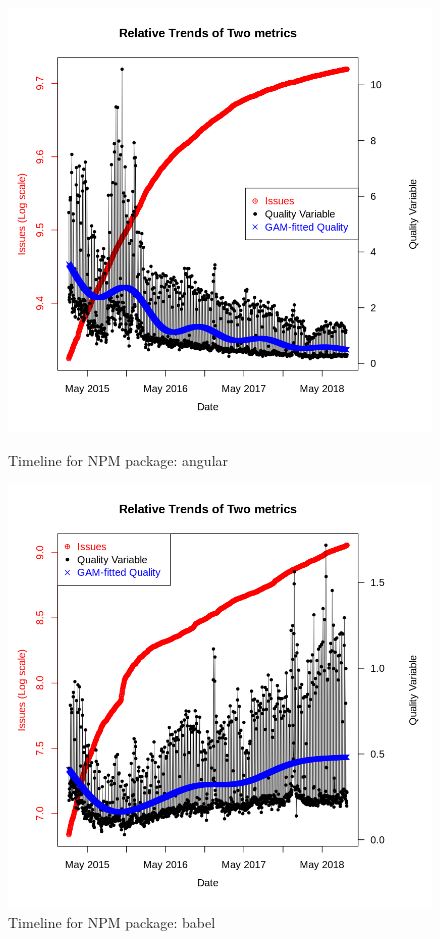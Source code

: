 \documentclass[smallcondensed]{svjour3}     %
\begin{document}
\begin{figure}[!t]
\begin{minipage}{.45\textwidth}
\centering
\includegraphics[width=\linewidth]{angular}
\caption{Timeline for NPM package: angular}
\label{fig:tNa}
\end{minipage}
\hfill
\begin{minipage}{.45\textwidth}
\centering
\includegraphics[width=\linewidth]{babel}
\caption{Timeline  for NPM package: babel}
\label{fig:tNb}
\end{minipage}
\vspace{-10pt}
\end{figure}
\end{document}
